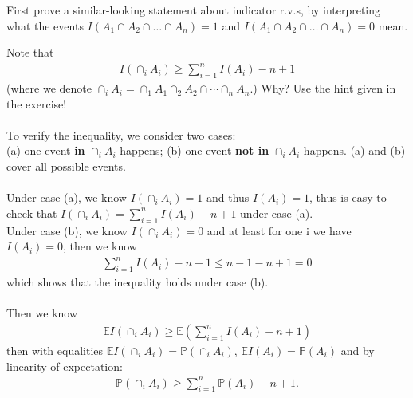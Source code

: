 
\setcounter{theorem}{44}
\begin{exercise} [BH.4.45]
\begin{hint}
    First prove a similar-looking statement about indicator r.v.s, by interpreting what the events $I(A_1 \cap A_2 \cap \hdots \cap A_n) = 1$ and $I(A_1 \cap A_2 \cap \hdots \cap A_n) = 0$ mean.
\end{hint}
\begin{solution}
    Note that
    \begin{align*}
    	I\left(\cap_i A_i \right) \geq \sum_{i=1}^n I(A_i) -n +1
    \end{align*}
    (where we denote $\cap_i A_i=\cap_1 A_1 \cap_2 A_2 \cap \cdots \cap_n A_n$.) Why?  Use the hint given in the exercise!\\~\\
    To verify the inequality, we consider two cases:\\ 
    (a) one event \textbf{in} $\cap_i A_i$ happens; (b) one event \textbf{not in} $\cap_i A_i$ happens. (a) and (b) cover all possible events. 
    ~\\~\\
    Under case (a), we know $I\left(\cap_i A_i \right)=1$ and thus $I(A_i)=1$, thus is easy to check that $	I\left(\cap_i A_i \right) = \sum_{i=1}^n I(A_i) -n +1$ under case (a).
    ~\\
    Under case (b), we know $I\left(\cap_i A_i \right)=0$ and at least for one i we have $I(A_i)=0$, then we know 
    \begin{align*}
    	\sum_{i=1}^n I(A_i) -n +1 \leq n-1 -n+1 =0
    \end{align*}
    which shows that the inequality holds under case (b).\\~\\
    Then we know 
    \begin{align*}
    	\mathbb{E}I\left(\cap_i A_i \right) \geq \mathbb{E}\left(\sum_{i=1}^n I(A_i) -n +1\right)
    \end{align*} 
    then with equalities $\mathbb{E}I\left(\cap_i A_i \right) = \mathbb{P}\left(\cap_i A_i \right)$, $\mathbb{E}I\left( A_i \right) = \mathbb{P}\left( A_i \right)$ and by linearity of expectation:
    \begin{align*}
    	\mathbb{P}\left(\cap_i A_i \right) \geq  \sum_{i=1}^n \mathbb{P}\left( A_i \right) -n +1 .
    \end{align*}
\end{solution}
\end{exercise}

